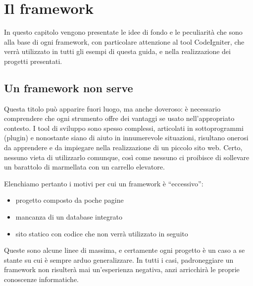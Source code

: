 \chapter{Il framework}
In questo capitolo vengono presentate le idee di fondo e le peculiarità che sono alla base di ogni framework, con particolare attenzione al tool CodeIgniter, che verrà utilizzato in tutti gli esempi di questa guida, e nella realizzazione dei progetti presentati.

\section{Un framework non serve}
Questa titolo può apparire fuori luogo, ma anche doveroso: è necessario comprendere che ogni strumento offre dei vantaggi se usato nell'appropriato contesto. I tool di sviluppo sono spesso complessi, articolati in sottoprogrammi (plugin) e nonostante siano di aiuto in innumerevole situazioni, risultano onerosi da apprendere e da impiegare nella realizzazione di un piccolo sito web. Certo, nessuno vieta di utilizzarlo comunque, così come nessuno ci proibisce di sollevare un barattolo di marmellata con un carrello elevatore. 

Elenchiamo pertanto i motivi per cui un framework è ``eccessivo'':

\label{sec:svantaggi}
\begin{itemize}
\item progetto composto da poche pagine
\item mancanza di un database integrato
\item sito statico con codice che non verrà utilizzato in seguito
\end{itemize}

Queste sono alcune linee di massima, e certamente ogni progetto è un caso a se stante su cui è sempre arduo generalizzare. In tutti i casi, padroneggiare un framework non risulterà mai un'esperienza negativa, anzi arricchirà le proprie conoscenze informatiche.

\label{sec:vantaggi}
